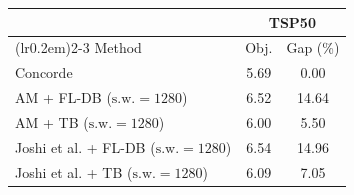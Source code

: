 \begin{tabular}{lcc}
\toprule[1.0pt]
\multicolumn{1}{c}{} & \multicolumn{2}{c}{TSP50}\\
\cmidrule[0.5pt](lr{0.2em}){2-3}
Method & Obj. & Gap (\%)\\
\midrule
Concorde & 5.69 & 0.00 \\
\midrule
AM + FL-DB ($\text{s.w.}=1280$) & 6.52 & 14.64 \\
AM + TB ($\text{s.w.}=1280$) & 6.00 & 5.50 \\
\midrule
Joshi et al. + FL-DB ($\text{s.w.}=1280$) & 6.54 & 14.96 \\
Joshi et al. + TB ($\text{s.w.}=1280$) & 6.09 & 7.05 \\
\bottomrule
\end{tabular}
